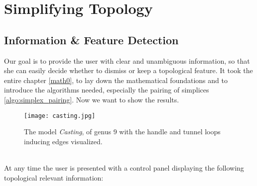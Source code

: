 \newpage
\section{Simplifying Topology}
\label{topstoc2}

\subsection{Information \& Feature Detection}
\label{topstoc21}

Our goal is to provide the user with clear and unambiguous information, so that she can easily decide whether to dismiss or keep a topological feature.
It took the entire chapter \ref{math0}, to lay down the mathematical foundations and to introduce the algorithms needed, especially the pairing of simplices \ref{algo:simplex_pairing}.
Now we want to show the results.
\begin{figure}[ht]
\centering
\texttt{[image: casting.jpg]}
\caption{The model \textit{Casting}, of genus 9 with the handle and tunnel loops inducing edges visualized.}
\label{fig:casting}
\end{figure}\\
At any time the user is presented with a control panel displaying the following topological relevant information:
